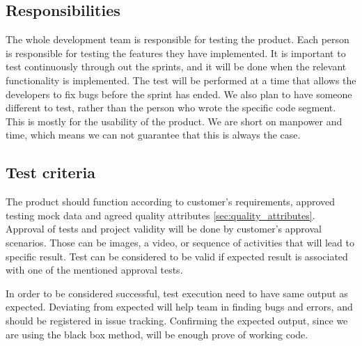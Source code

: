 \subsection{Responsibilities}
The whole development team is responsible for testing the product. 
Each person is responsible for testing the features they have implemented. It is important to test continuously through out the sprints, and it will be done when the relevant functionality is implemented. The test will be performed at a time that allows the developers to fix bugs before the sprint has ended.
We also plan to have someone different to test, rather than the person who wrote the specific code segment. 
This is mostly for the usability of the product. We are short on manpower and time, which means we can not guarantee that this is always the case.
 

\subsection{Test criteria} 

The product should function according to customer's requirements, approved testing mock data and agreed quality attributes  \ref{sec:quality_attributes}.
Approval of tests and project validity will be done by customer's approval scenarios. 
Those can be images, a video, or sequence of activities that will lead to specific result. 
Test can be considered to be valid if expected result is associated with one of the mentioned approval tests.

In order to be considered successful, test execution need to have same output as expected. 
Deviating from expected will help team in finding bugs and errors, and should be registered in issue tracking.
Confirming the expected output, since we are using the black box method, will be enough prove of working code.

